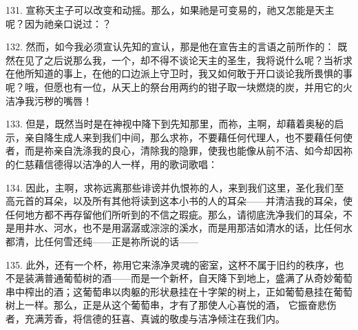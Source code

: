 131. 宣称天主子可以改变和动摇。那么，如果祂是可变易的，祂又怎能是天主呢？因为祂亲口说过：？\par

\par

132. 然而，如今我必须宣认先知的宣认，那是他在宣告主的言语之前所作的： 既然在见了之后说那么我，一个，却不得不谈论天主的圣生，我将说什么呢？当祈求在他所知道的事上，在他的口边派上守卫时，我又如何敢于开口谈论我所畏惧的事呢？哦，但愿也有一位，从天上的祭台用两约的钳子取一块燃烧的炭，并用它的火洁净我污秽的嘴唇！\par

133. 但是，既然当时是在神视中降下到先知那里，而祢，主啊，却藉着奥秘的启示，亲自降生成人来到我们中间，那么求祢，不要藉任何代理人，也不要藉任何使者，而是祢亲自洗涤我的良心，清除我的隐罪，使我也能像从前不洁、如今却因祢的仁慈藉信德得以洁净的人一样，用的歌词歌唱：\par

134. 因此，主啊，求祢远离那些诽谤并仇恨祢的人，来到我们这里，圣化我们至高元首的耳朵，以及所有其他将读到这本小书的人的耳朵——并清洁我的耳朵，使任何地方都不再存留他们所听到的不信之瑕疵。那么，请彻底洗净我们的耳朵，不是用井水、河水，也不是用潺潺或淙淙的溪水，而是用那洁如清水的话，比任何水都清，比任何雪还纯——正是祢所说的话——\par

135. 此外，还有一个杯，祢用它来涤净灵魂的密室，这杯不属于旧约的秩序，也不是装满普通葡萄树的酒——而是一个新杯，自天降下到地上，盛满了从奇妙葡萄串中榨出的酒；这葡萄串以肉躯的形状悬挂在十字架的树上，正如葡萄悬挂在葡萄树上一样。那么，正是从这个葡萄串，才有了那使人心喜悦的酒， 它振奋悲伤者，充满芳香，将信德的狂喜、真诚的敬虔与洁净倾注在我们内。\par

